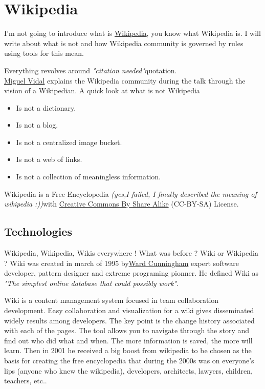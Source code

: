 \section{Wikipedia}
\label{sec:wikipedia}

I'm not going to introduce what is \href{http://www.wikipedia.org/}{Wikipedia}, you know what Wikipedia is. I will write about what is not and how Wikipedia community is governed by rules using tools for this mean.

\par Everything revolves around \textit{"citation needed"}quotation.
\\\href{http://gsyc.urjc.es/~mvidal/}{Miguel Vidal} explains the Wikipedia community during the talk through the vision of a Wikipedian. A quick look at what is not Wikipedia

\begin{itemize}
	\item Is not a dictionary.
	\item Is not a blog.
	\item Is not a centralized image bucket.
	\item Is not a web of links.
	\item Is not a collection of meaningless information.
\end{itemize} Wikipedia is a Free Encyclopedia \textit{(yes,I failed, I finally described the meaning of wikipedia :))}with \href{http://creativecommons.org/licenses/by-sa/3.0/}{Creative Commons By Share Alike} (CC-BY-SA) License.

\subsection{Technologies}

\par Wikipedia, Wikipedia, Wikis everywhere ! What was before ? Wiki or Wikipedia ? Wiki was created in march of 1995 by\href{http://c2.com/~ward/}{Ward Cunningham} expert software developer, pattern designer and extreme programing pionner. He defined Wiki as \textit{"The simplest online database that could possibly work"}.

\par Wiki is a content management system focused in team collaboration development. Easy collaboration and visualization for a wiki gives disseminated widely results among developers. The key point is the change history associated with each of the pages. The tool allows you to navigate through the story and find out who did what and when. The more information is saved, the more will learn. Then in 2001 he received a big boost from wikipedia to be chosen as the basis for creating the free encyclopedia that during the 2000s was on everyone's lips (anyone who knew the wikipedia), developers, architects, lawyers, children, teachers, etc..

